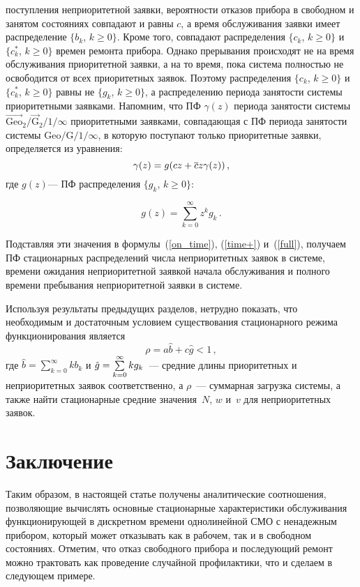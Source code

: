 \begin{multicols}{2}
\pagebreak

\noindent
 поступления
неприоритетной заявки, вероятности отказов прибора в свободном и
занятом состояниях совпадают и равны $c$, а время обслуживания
заявки имеет распределение $\{b_k$, $k\ge 0\}$. Кроме того,
совпадают распределения $\{c_k$, $k\ge 0\}$ и $\{c^*_k$, $k\ge
0\}$ времен ремонта прибора. Однако прерывания происходят не на
время обслуживания приоритетной заявки, а на то время, пока система
полностью не освободится от всех приоритетных заявок. Поэтому
распределения $\{c_k$, $k\ge 0\}$ и $\{c^*_k$, $k\ge 0\}$ равны не
$\{g_k$, $k\ge 0\}$, а распределению периода занятости системы
приоритетными заявками. Напомним, что ПФ $\gamma (z)$ периода
занятости системы $\vec{\mbox{Geo}}_{2}/\vec{\mbox{G}}_{2}/1/\infty$ приоритетными
заявками, совпадающая с ПФ периода занятости сис\-те\-мы
$\mbox{Geo}/\mbox{G}/1/\infty$, в которую поступают только приоритетные заявки,
определяется из уравнения:
$$
\gamma (z) = g(c z + \overline c z \gamma(z))\,,
$$
где $g(z)$--- ПФ распределения $\{g_k$, $k\ge 0\}$:

\noindent
$$
g(z) = \sum_{k=0}^\infty z^k g_k\,.
$$


Подставляя эти значения в формулы~(\ref{on_time}), (\ref{time+})
и~(\ref{full}),
получаем ПФ стационарных распределений числа неприоритетных
заявок в системе, времени ожидания неприоритетной заявкой
начала обслуживания и полного времени пребывания
неприоритетной заявки в системе.

Используя результаты предыдущих разделов, нетрудно показать,
что необходимым и достаточным условием существования
стационарного режима функционирования является
$$
\rho = a \hat b + c \hat g < 1\,,
$$
где $\hat b = \sum\limits_{k=0}^{\infty} k b_k$ и
$\hat g \hm= \sum\limits_{k=0}^{\infty} k g_k$~--- средние
длины приоритетных и неприоритетных заявок соответственно, а
$\rho$~--- суммарная загрузка системы,
а также найти стационарные средние значения~$N$, $w$ и~$v$ для
неприоритетных заявок.

\vspace*{-9pt}

\section{Заключение}

Таким образом, в настоящей статье получены аналитические
соотношения, позволяющие вы\-чис\-лять основные стационарные
характеристики обслуживания функционирующей в дискретном
време\-ни однолинейной СМО с ненадежным прибором, который
может отказывать как в рабочем, так и в свободном
состояниях.
Отметим, что отказ свободного прибора и последующий ремонт
можно трактовать как проведение случайной профилактики,
что и сделаем в следующем примере.


\end{multicols}
